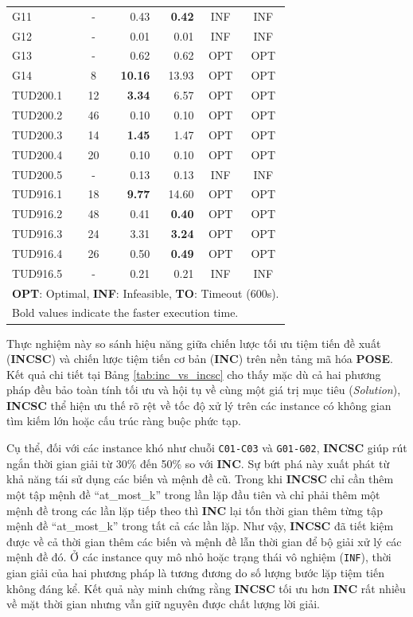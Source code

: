 \documentclass[letterpaper,journal]{IEEEtran}
\begin{document}
\begin{table}[htbp]
\begin{tabular}{l c r r c c}
G11 & - & 0.43 & \textbf{0.42} & INF & INF \\
G12 & - & 0.01 & 0.01 & INF & INF \\
G13 & - & 0.62 & 0.62 & OPT & OPT \\
G14 & 8 & \textbf{10.16} & 13.93 & OPT & OPT \\
TUD200.1 & 12 & \textbf{3.34} & 6.57 & OPT & OPT \\
TUD200.2 & 46 & 0.10 & 0.10 & OPT & OPT \\
TUD200.3 & 14 & \textbf{1.45} & 1.47 & OPT & OPT \\
TUD200.4 & 20 & 0.10 & 0.10 & OPT & OPT \\
TUD200.5 & - & 0.13 & 0.13 & INF & INF \\
TUD916.1 & 18 & \textbf{9.77} & 14.60 & OPT & OPT \\
TUD916.2 & 48 & 0.41 & \textbf{0.40} & OPT & OPT \\
TUD916.3 & 24 & 3.31 & \textbf{3.24} & OPT & OPT \\
TUD916.4 & 26 & 0.50 & \textbf{0.49} & OPT & OPT \\
TUD916.5 & - & 0.21 & 0.21 & INF & INF \\
\bottomrule
\multicolumn{6}{l}{\footnotesize \textbf{OPT}: Optimal, \textbf{INF}: Infeasible, \textbf{TO}: Timeout (600s).} \\
\multicolumn{6}{l}{\footnotesize Bold values indicate the faster execution time.}
\end{tabular}
\end{table}

Thực nghiệm này so sánh hiệu năng giữa chiến lược tối ưu tiệm tiến đề xuất (\textbf{INCSC}) và chiến lược tiệm tiến cơ bản (\textbf{INC}) trên nền tảng mã hóa \textbf{POSE}. Kết quả chi tiết tại Bảng \ref{tab:inc_vs_incsc} cho thấy mặc dù cả hai phương pháp đều bảo toàn tính tối ưu và hội tụ về cùng một giá trị mục tiêu (\textit{Solution}), \textbf{INCSC} thể hiện ưu thế rõ rệt về tốc độ xử lý trên các instance có không gian tìm kiếm lớn hoặc cấu trúc ràng buộc phức tạp. 

Cụ thể, đối với các instance khó như chuỗi \texttt{C01-C03} và \texttt{G01-G02}, \textbf{INCSC} giúp rút ngắn thời gian giải từ 30\% đến 50\% so với \textbf{INC}. Sự bứt phá này xuất phát từ khả năng tái sử dụng các biến và mệnh đề cũ. Trong khi \textbf{INCSC} chỉ cần thêm một tập mệnh đề ``at\_most\_k'' trong lần lặp đầu tiên và chỉ phải thêm một mệnh đề trong các lần lặp tiếp theo thì \textbf{INC} lại tốn thời gian thêm từng tập mệnh đề ``at\_most\_k'' trong tất cả các lần lặp. Như vậy, \textbf{INCSC} đã tiết kiệm được về cả thời gian thêm các biến và mệnh đề lẫn thời gian để bộ giải xử lý các mệnh đề đó.
Ở các instance quy mô nhỏ hoặc trạng thái vô nghiệm (\texttt{INF}), thời gian giải của hai phương pháp là tương đương do số lượng bước lặp tiệm tiến không đáng kể. Kết quả này minh chứng rằng \textbf{INCSC} tối ưu hơn \textbf{INC} rất nhiều về mặt thời gian nhưng vẫn giữ nguyên được chất lượng lời giải.
\end{document}
